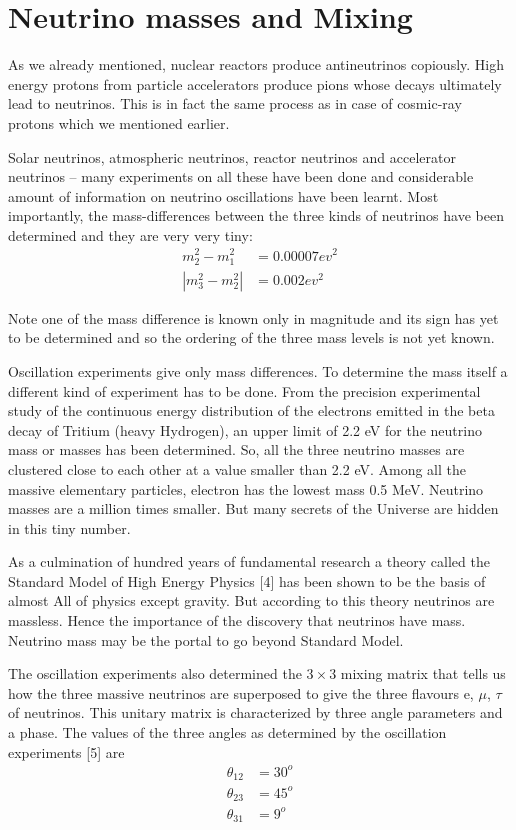 \section{Neutrino masses and Mixing}

As we already mentioned, nuclear reactors produce antineutrinos copiously. High energy protons from particle accelerators produce pions whose
decays ultimately lead to neutrinos. This is in fact the same process as in
case of cosmic-ray protons which we mentioned earlier.

Solar neutrinos, atmospheric neutrinos, reactor neutrinos and accelerator
neutrinos – many experiments on all these have been done and considerable amount of information on neutrino oscillations have been learnt. Most
importantly, the mass-differences between the three kinds of neutrinos have
been determined and they are very very tiny:
\begin{align*}
m^{2}_{2}-m_{1}^{2} &= 0.00007ev^{2}\\
|m_{3}^{2} -m_{2}^{2}| &= 0.002ev^{2}
\end{align*}

Note one of the mass difference is known only in magnitude and its sign
has yet to be determined and so the ordering of the three mass levels is not
yet known.

Oscillation experiments give only mass differences. To determine the
mass itself a different kind of experiment has to be done. From the precision
experimental study of the continuous energy distribution of the electrons
emitted in the beta decay of Tritium (heavy Hydrogen), an upper limit of
2.2 eV for the neutrino mass or masses has been determined. So, all the three
neutrino masses are clustered close to each other at a value smaller than 2.2
eV. Among all the massive elementary particles, electron has the lowest mass
0.5 MeV. Neutrino masses are a million times smaller. But many secrets of
the Universe are hidden in this tiny number.

As a culmination of hundred years of fundamental research a theory called
the Standard Model of High Energy Physics [4] has been shown to be the
basis of almost All of physics except gravity. But according to this theory
neutrinos are massless. Hence the importance of the discovery that neutrinos
have mass. Neutrino mass may be the portal to go beyond Standard Model.

The oscillation experiments also determined the $3 \times 3$ mixing matrix that
tells us how the three massive neutrinos are superposed to give the three
flavours e, $\mu$, $\tau$ of neutrinos. This unitary matrix is characterized by three
angle parameters and a phase. The values of the three angles as determined
by the oscillation experiments [5] are
\begin{align*}
\theta_{12} &= 30^{o}\\
\theta_{23} & = 45^{o}\\
\theta_{31} & = 9^{o}
\end{align*}

